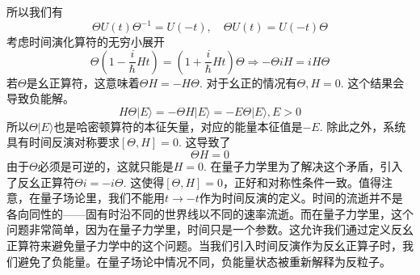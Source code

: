 \documentclass{article}
\numberwithin{equation}{subsection}
\begin{document}
所以我们有
\begin{equation}
    \Theta U(t)\Theta^{-1}=U(-t),\quad\Theta U(t)=U(-t)\Theta
\end{equation}
考虑时间演化算符的无穷小展开
\begin{equation}
    \Theta(1-\frac{i}{\hbar}Ht)=(1+\frac{i}{\hbar}Ht)\Theta\Rightarrow -\Theta iH=iH\Theta
\end{equation}
若$\Theta$是幺正算符，这意味着$\Theta H=-H\Theta$. 对于幺正的情况有${\Theta,H}=0$. 这个结果会导致负能解。
\begin{equation}
    H\Theta |E\rangle=-\Theta H|E\rangle=-E\Theta|E\rangle,E>0
\end{equation}
所以$\Theta|E\rangle$也是哈密顿算符的本征矢量，对应的能量本征值是$-E$. 除此之外，系统具有时间反演对称要求$[\Theta,H]=0$. 这导致了
\begin{equation}
    \Theta H=0
\end{equation}
由于$\Theta$必须是可逆的，这就只能是$H=0$. 在量子力学里为了解决这个矛盾，引入了反幺正算符$\Theta i=-i\Theta$. 这使得$[\Theta,H]=0$，正好和对称性条件一致。值得注意，在量子场论里，我们不能用$t\rightarrow-t$作为时间反演的定义。时间的流逝并不是各向同性的——固有时沿不同的世界线以不同的速率流逝。而在量子力学里，这个问题非常简单，因为在量子力学里，时间只是一个参数。这允许我们通过定义反幺正算符来避免量子力学中的这个问题。当我们引入时间反演作为反幺正算子时，我们避免了负能量。在量子场论中情况不同，负能量状态被重新解释为反粒子。
\end{document}
